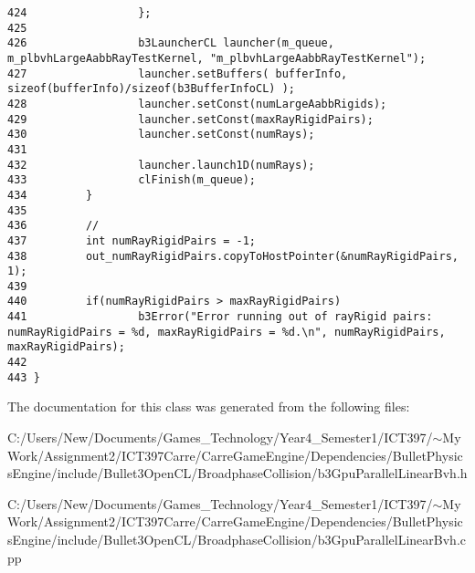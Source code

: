 \begin{Code}
\begin{verbatim}
424                 };
425                 
426                 b3LauncherCL launcher(m_queue, m_plbvhLargeAabbRayTestKernel, "m_plbvhLargeAabbRayTestKernel");
427                 launcher.setBuffers( bufferInfo, sizeof(bufferInfo)/sizeof(b3BufferInfoCL) );
428                 launcher.setConst(numLargeAabbRigids);
429                 launcher.setConst(maxRayRigidPairs);
430                 launcher.setConst(numRays);
431                 
432                 launcher.launch1D(numRays);
433                 clFinish(m_queue);
434         }
435         
436         //
437         int numRayRigidPairs = -1;
438         out_numRayRigidPairs.copyToHostPointer(&numRayRigidPairs, 1);
439         
440         if(numRayRigidPairs > maxRayRigidPairs)
441                 b3Error("Error running out of rayRigid pairs: numRayRigidPairs = %d, maxRayRigidPairs = %d.\n", numRayRigidPairs, maxRayRigidPairs);
442         
443 }
\end{verbatim}
\end{Code}




The documentation for this class was generated from the following files:\begin{CompactItemize}
\item 
C:/Users/New/Documents/Games\_\-Technology/Year4\_\-Semester1/ICT397/$\sim$My Work/Assignment2/ICT397Carre/CarreGameEngine/Dependencies/BulletPhysicsEngine/include/Bullet3OpenCL/BroadphaseCollision/b3GpuParallelLinearBvh.h\item 
C:/Users/New/Documents/Games\_\-Technology/Year4\_\-Semester1/ICT397/$\sim$My Work/Assignment2/ICT397Carre/CarreGameEngine/Dependencies/BulletPhysicsEngine/include/Bullet3OpenCL/BroadphaseCollision/b3GpuParallelLinearBvh.cpp\end{CompactItemize}
